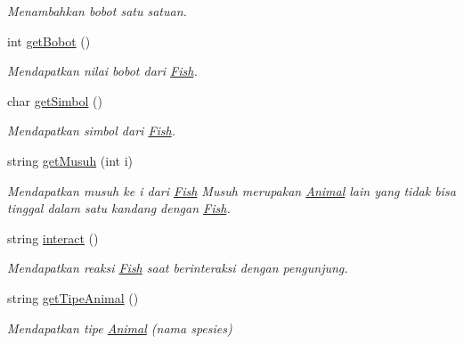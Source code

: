 \begin{DoxyCompactItemize}
\begin{DoxyCompactList}\small\item\em Menambahkan bobot satu satuan. \end{DoxyCompactList}\item 
int \hyperlink{classFish_a3784ee11609ee4333d58468234a33c34}{get\-Bobot} ()
\begin{DoxyCompactList}\small\item\em Mendapatkan nilai bobot dari \hyperlink{classFish}{Fish}. \end{DoxyCompactList}\item 
char \hyperlink{classFish_adca0f30d1999f94c6c4bfce15a195f7f}{get\-Simbol} ()
\begin{DoxyCompactList}\small\item\em Mendapatkan simbol dari \hyperlink{classFish}{Fish}. \end{DoxyCompactList}\item 
string \hyperlink{classFish_ad576d177ba8b6ff98502d559e7584177}{get\-Musuh} (int i)
\begin{DoxyCompactList}\small\item\em Mendapatkan musuh ke i dari \hyperlink{classFish}{Fish} Musuh merupakan \hyperlink{classAnimal}{Animal} lain yang tidak bisa tinggal dalam satu kandang dengan \hyperlink{classFish}{Fish}. \end{DoxyCompactList}\item 
string \hyperlink{classFish_a15708e2598e6b5f20bf8b9b578db3eae}{interact} ()
\begin{DoxyCompactList}\small\item\em Mendapatkan reaksi \hyperlink{classFish}{Fish} saat berinteraksi dengan pengunjung. \end{DoxyCompactList}\item 
string \hyperlink{classFish_ac97e9f2a7652627b63f75cc0ef588578}{get\-Tipe\-Animal} ()
\begin{DoxyCompactList}\small\item\em Mendapatkan tipe \hyperlink{classAnimal}{Animal} (nama spesies) \end{DoxyCompactList}\end{DoxyCompactItemize}
